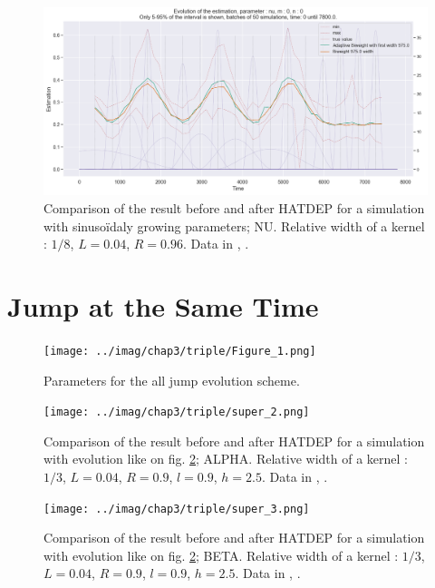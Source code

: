 \begin{figure}
\centering
\includegraphics[width = 0.90 \textwidth]{../imag/chap3/4_bis/R.png}
\caption{Comparison of the result before and after HATDEP for a simulation with sinusoïdaly growing parameters; NU. Relative width of a kernel : $1/8$, $L = 0.04$, $R = 0.96$. Data in \protect {}, \protect {}.}
\label{fig:second_estimate_4_nu}
\end{figure}

\section{Jump at the Same Time}





\begin{figure}
\centering
\texttt{[image: ../imag/chap3/triple/Figure\_1.png]}
\caption{Parameters for the all jump evolution scheme.}
\label{fig:evolution_second_estimate_12}
\end{figure}




\begin{figure}
\centering
\texttt{[image: ../imag/chap3/triple/super\_2.png]}
\caption{Comparison of the result before and after HATDEP for a simulation with evolution like on fig. \ref{fig:evolution_second_estimate_12}; ALPHA. Relative width of a kernel : $1/3$, $L = 0.04$, $R = 0.9$, $l = 0.9$, $h = 2.5$. Data in \protect {}, \protect {}.}
\label{fig:second_estimate_12_alpha}
\end{figure}

\begin{figure}
\centering
\texttt{[image: ../imag/chap3/triple/super\_3.png]}
\caption{Comparison of the result before and after HATDEP for a simulation with evolution like on fig. \ref{fig:evolution_second_estimate_12}; BETA. Relative width of a kernel : $1/3$, $L = 0.04$, $R = 0.9$, $l = 0.9$, $h = 2.5$. Data in \protect {}, \protect {}.}
\label{fig:second_estimate_12_beta}
\end{figure}

